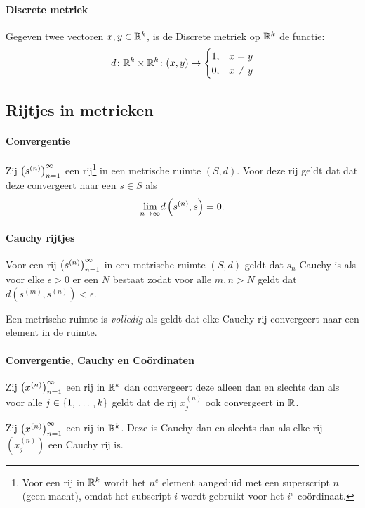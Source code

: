 \paragraph{Discrete metriek} Gegeven twee vectoren \(x,y\in\mathbb{R}^{k}\), is de Discrete metriek op \(\mathbb{R}^{k}\) de functie:
\[
    d\colon\mathbb{R}^{k}\times\mathbb{R}^{k}\colon(x,y)\mapsto\begin{cases}
        1,& x=y\\
        0,& x\neq y
    \end{cases}
\]

\subsection{Rijtjes in metrieken}

\paragraph{Convergentie} Zij \(\left(s^{(n)}\right)_{n=1}^{\infty}\) een rij\footnote{Voor een rij in \(\mathbb{R}^{k}\) wordt het \(n^{e}\) element aangeduid met een superscript \(n\) (geen macht), omdat het subscript \(i\) wordt gebruikt voor het \(i^{e}\) coördinaat.} in een metrische ruimte \((S,d)\). Voor deze rij geldt dat dat deze convergeert naar een \(s\in S\) als 
\[
    \underset{n\to\infty}{\text{lim}}d\left(s^{(n)},s\right)=0.
\]

\paragraph{Cauchy rijtjes} Voor een rij \(\left(s^{(n)}\right)_{n=1}^{\infty}\) in een metrische ruimte \((S,d)\) geldt dat \(s_{n}\) Cauchy is als voor elke \(\epsilon>0\) er een \(N\) bestaat zodat voor alle \(m,n>N\) geldt dat \(d\left(s^{(m)},s^{(n)}\right)<\epsilon\).

Een metrische ruimte is \emph{volledig} als geldt dat elke Cauchy rij convergeert naar een element in de ruimte.

\paragraph{Convergentie, Cauchy en Coördinaten} Zij \(\left(x^{(n)}\right)_{n=1}^{\infty}\) een rij in \(\mathbb{R}^{k}\) dan convergeert deze alleen dan en slechts dan als voor alle \(j\in\{1,\,\dots\,,k\}\) geldt dat de rij \(x^{(n)}_{j}\) ook convergeert in \(\mathbb{R}\).

Zij \(\left(x^{(n)}\right)_{n=1}^{\infty}\) een rij in \(\mathbb{R}^{k}\). Deze is Cauchy dan en slechts dan als elke rij \((x_{j}^{(n)})\) een Cauchy rij is.

